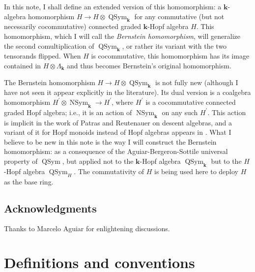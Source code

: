\documentclass
[numbers=enddot,12pt,final,onecolumn,notitlepage,abstracton]{scrartcl}%
\theoremstyle{definition}
\begin{document}
In this note, I shall define an extended version of this homomorphism: a
$\mathbf{k}$-algebra homomorphism $H\rightarrow H\otimes\operatorname*{QSym}%
\nolimits_{\mathbf{k}}$ for any commutative (but not necessarily
cocommutative) connected graded $\mathbf{k}$-Hopf algebra $H$. This
homomorphism, which I will call the \textit{Bernstein homomorphism}, will
generalize the second comultiplication of $\operatorname*{QSym}%
\nolimits_{\mathbf{k}}$, or rather its variant with the two tensorands
flipped. When $H$ is cocommutative, this homomorphism has its image contained
in $H\otimes\Lambda_{\mathbf{k}}$ and thus becomes Bernstein's original homomorphism.

The Bernstein homomorphism $H\rightarrow H\otimes\operatorname*{QSym}%
\nolimits_{\mathbf{k}}$ is not fully new (although I have not seen it appear
explicitly in the literature). Its dual version is a coalgebra homomorphism
$H^{\prime}\otimes\operatorname*{NSym}\nolimits_{\mathbf{k}}\rightarrow
H^{\prime}$, where $H^{\prime}$ is a cocommutative connected graded Hopf
algebra; i.e., it is an action of $\operatorname*{NSym}\nolimits_{\mathbf{k}}$
on any such $H^{\prime}$. This action is implicit in the work of Patras and
Reutenauer on descent algebras, and a variant of it for Hopf monoids instead
of Hopf algebras appears in \cite[Propositions 84 and 88, and especially the
Remark after Proposition 88]{Aguiar13}. What I believe to be new in this note
is the way I will construct the Bernstein homomorphism: as a consequence of
the Aguiar-Bergeron-Sottile universal property of $\operatorname*{QSym}$, but
applied not to the $\mathbf{k}$-Hopf algebra $\operatorname*{QSym}%
\nolimits_{\mathbf{k}}$ but to the $H$-Hopf algebra $\operatorname*{QSym}%
\nolimits_{H}$. The commutativity of $H$ is being used here to deploy $H$ as
the base ring.

\subsection*{Acknowledgments}

Thanks to Marcelo Aguiar for enlightening discussions.

\section{Definitions and conventions}
\end{document}
